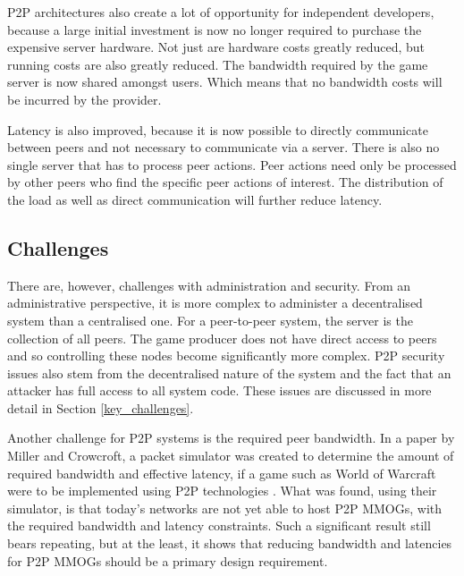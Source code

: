 \documentclass[10pt,a4paper,journal,cspaper,compsoc]{IEEEtran}
\begin{document}
\ac{P2P} architectures also create a lot of opportunity for independent developers, because a large initial investment is now no longer required to
purchase the expensive server hardware. Not just are hardware costs greatly reduced, but running costs are also greatly reduced. The bandwidth
required by the game server is now shared amongst users. Which means that no bandwidth costs will be incurred by the provider.

Latency is also improved, because it is now possible to directly communicate between peers and not necessary to communicate via a server. There is
also no single server that has to process peer actions. Peer actions need only be processed by other peers who find the specific peer actions of
interest. The distribution of the load as well as direct communication will further reduce latency.

\subsection{Challenges}

There are, however, challenges with administration and security. From an administrative perspective, it is more complex to administer a decentralised
system than a centralised one. For a peer-to-peer system, the server is the collection of all peers. The game producer does not have direct access to
peers and so controlling these nodes become significantly more complex. P2P security issues also stem from the decentralised nature of the system and
the fact that an attacker has full access to all system code. These issues are discussed in more detail in Section \ref{key_challenges}.

Another challenge for P2P systems is the required peer bandwidth. In a paper by Miller and Crowcroft, a packet simulator was created to determine the
amount of required bandwidth and effective latency, if a game such as World of Warcraft were to be implemented using P2P technologies
\cite{Miller_p2p_infeasability}. What was found, using their simulator, is that today's networks are not yet able to host P2P MMOGs, with the
required bandwidth and latency constraints. Such a significant result still bears repeating, but at the least, it shows that reducing bandwidth and
latencies for P2P MMOGs should be a primary design requirement.
\end{document}
